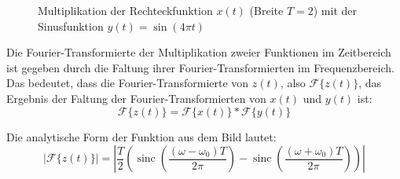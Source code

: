 \begin{figure}[H]
    \centering
    \caption{Multiplikation der Rechteckfunktion $x(t)$ (Breite $T=2$) mit der Sinusfunktion $y(t) = \sin(4\pi t)$}
    \label{fig:rechteck_sinus}
\end{figure}

Die Fourier-Transformierte der Multiplikation zweier Funktionen im Zeitbereich ist gegeben durch die Faltung ihrer Fourier-Transformierten im Frequenzbereich. Das bedeutet, dass die Fourier-Transformierte von $z(t)$, also $\mathcal{F}\{z(t)\}$, das Ergebnis der Faltung der Fourier-Transformierten von $x(t)$ und $y(t)$ ist:
\[
\mathcal{F}\{z(t)\} = \mathcal{F}\{x(t)\} * \mathcal{F}\{y(t)\}
\]

Die analytische Form der Funktion aus dem Bild lautet:
\[
\left| \mathcal{F}\{z(t)\} \right| = \left| \frac{T}{2} \left( 
\operatorname{sinc}\left(\frac{(\omega-\omega_0)T}{2\pi}\right)
- 
\operatorname{sinc}\left(\frac{(\omega+\omega_0)T}{2\pi}\right)
\right) \right|
\]

